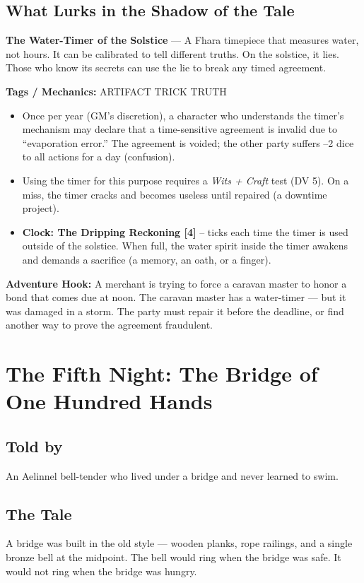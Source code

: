 \documentclass[10pt,twoside]{book}
\newcommand{\tag}[1]{\textsc{#1}}
\begin{document}
\section*{What Lurks in the Shadow of the Tale}
\begin{infobox}
\textbf{The Water-Timer of the Solstice} --- A Fhara timepiece that measures water, not hours. It can be calibrated to tell different truths. On the solstice, it lies. Those who know its secrets can use the lie to break any timed agreement.

\textbf{Tags / Mechanics:} \tag{ARTIFACT} \tag{TRICK} \tag{TRUTH}

\begin{itemize}
\item Once per year (GM's discretion), a character who understands the timer's mechanism may declare that a time-sensitive agreement is invalid due to ``evaporation error.'' The agreement is voided; the other party suffers --2 dice to all actions for a day (confusion).
\item Using the timer for this purpose requires a \textit{Wits + Craft} test (DV 5). On a miss, the timer cracks and becomes useless until repaired (a downtime project).
\item \textbf{Clock: The Dripping Reckoning [4]} -- ticks each time the timer is used outside of the solstice. When full, the water spirit inside the timer awakens and demands a sacrifice (a memory, an oath, or a finger).
\end{itemize}

\textbf{Adventure Hook:} A merchant is trying to force a caravan master to honor a bond that comes due at noon. The caravan master has a water-timer --- but it was damaged in a storm. The party must repair it before the deadline, or find another way to prove the agreement fraudulent.
\end{infobox}

\chapter{The Fifth Night: The Bridge of One Hundred Hands}

\section*{Told by}
An Aelinnel bell-tender who lived under a bridge and never learned to swim.

\section*{The Tale}
A bridge was built in the old style --- wooden planks, rope railings, and a single bronze bell at the midpoint. The bell would ring when the bridge was safe. It would not ring when the bridge was hungry.
\end{document}

